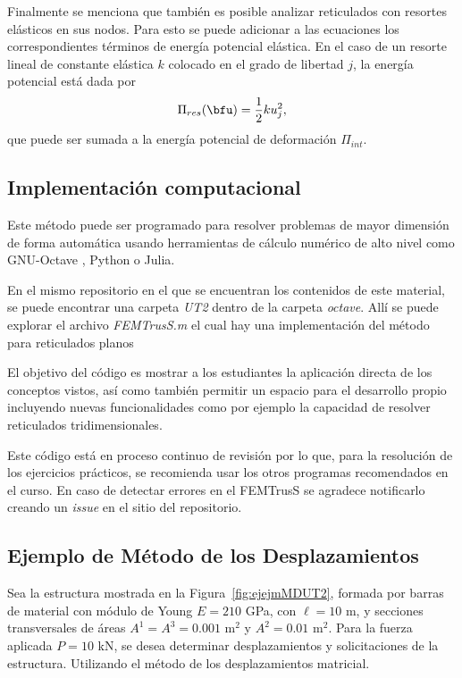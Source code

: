 Finalmente se menciona que también es posible analizar reticulados con resortes elásticos en sus nodos. Para esto se puede adicionar a las ecuaciones los correspondientes términos de energía potencial elástica. %
%
En el caso de un resorte lineal de constante elástica $k$ colocado en el grado de libertad $j$, la energía potencial está dada por
%
\begin{equation}
\Pi_{res}(\bfu) = \frac{1}{2} k u_j^2,
\end{equation}
%
que puede ser sumada a la energía potencial de deformación $\Pi_{int}$.







\subsection{Implementación computacional}

Este método puede ser programado para resolver problemas de mayor dimensión de forma automática usando herramientas de cálculo numérico de alto nivel como GNU-Octave \citep{Eaton2015}, Python o Julia.  %

En el mismo repositorio en el que se encuentran los contenidos de este material, se puede encontrar una carpeta \textit{UT2} dentro de la carpeta \textit{octave}. Allí se puede explorar el archivo \textit{FEMTrusS.m} el cual hay una implementación del método para reticulados planos


El objetivo del código es mostrar a los estudiantes la aplicación directa de los conceptos vistos, así como también permitir un espacio para el desarrollo propio incluyendo nuevas funcionalidades como por ejemplo la capacidad de resolver reticulados tridimensionales. %

Este código está en proceso continuo de revisión por lo que, para la resolución de los ejercicios prácticos, se recomienda usar los otros programas recomendados en el curso. %
%
En caso de detectar errores en el FEMTrusS se agradece notificarlo creando un \textit{issue} en el sitio del repositorio.






\subsection{Ejemplo de Método de los Desplazamientos} \label{sec:ejemplobarra}

Sea la estructura mostrada en la Figura~\ref{fig:ejejmMDUT2}, formada por barras de material con módulo de Young $E=210 $ GPa, con $\ell= 10$ m, y secciones transversales  de áreas $A^1 = A^3 = 0.001$ m$^2$ y $A^2 = 0.01 $ m$^2$. %
%
Para la fuerza aplicada $P= 10 $ kN, se desea determinar desplazamientos y solicitaciones de la estructura. Utilizando el método de los desplazamientos matricial.

